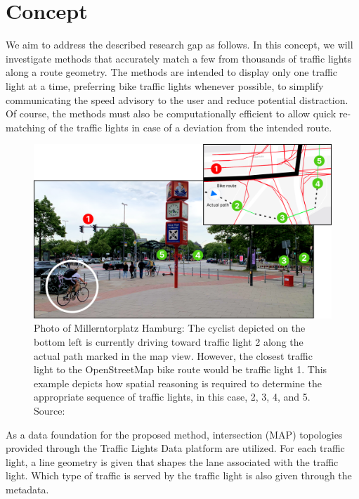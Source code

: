 \section{Concept}

We aim to address the described research gap as follows. In this concept, we will investigate methods that accurately match a few from thousands of traffic lights along a route geometry. The methods are intended to display only one traffic light at a time, preferring bike traffic lights whenever possible, to simplify communicating the speed advisory to the user and reduce potential distraction. Of course, the methods must also be computationally efficient to allow quick re-matching of the traffic lights in case of a deviation from the intended route.

\begin{figure}[t]
\centering
\includegraphics[width=\linewidth]{images/sg-selection-example.png}
\caption{Photo of Millerntorplatz Hamburg: The cyclist depicted on the bottom left is currently driving toward traffic light 2 along the actual path marked in the map view. However, the closest traffic light to the OpenStreetMap bike route would be traffic light 1. This example depicts how spatial reasoning is required to determine the appropriate sequence of traffic lights, in this case, 2, 3, 4, and 5. Source: \cite{matthes2023geo}}
\label{fig:sg-selection-example}
\end{figure}

As a data foundation for the proposed method, intersection (MAP) topologies provided through the Traffic Lights Data platform are utilized. For each traffic light, a line geometry is given that shapes the lane associated with the traffic light. Which type of traffic is served by the traffic light is also given through the metadata.

